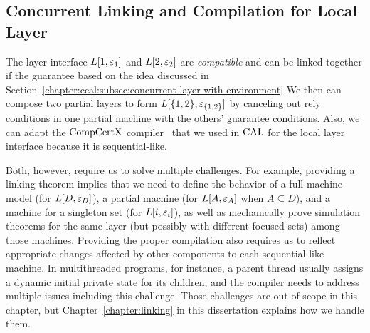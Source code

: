 \subsection{Concurrent Linking and Compilation for Local Layer}
\label{chapter:ccal:subsec:concurrent-linking-and compilation-for-local-layer}

The layer interface $L[1, {\varepsilon}_1]$ and $L[2, {\varepsilon}_2]$ are  {\em compatible} and can be linked together if the guarantee based on
the idea discussed in Section~\ref{chapter:ccal:subsec:concurrent-layer-with-environment}
We then can compose two partial layers to form 
$L[\{1, 2\}, {\varepsilon}_{\{1, 2\}}]$ by canceling out rely conditions in one partial machine with the others' guarantee conditions.
Also, we can adapt the $\mathrm{CompCertX}$ compiler~\cite{deepspec} that we used in $\mathrm{CAL}$
for the local layer interface because it is sequential-like.

Both, however, require us to solve multiple challenges. 
For example, providing a linking theorem  
implies that we need to define the behavior of a full machine model (for $L[D, {\varepsilon}_{D}]$), a partial machine (for $L[A, {\varepsilon}_{A}]$ when $A \subseteq D$), and 
a machine for a singleton set (for $L[i, {\varepsilon}_{i}]$), as well as mechanically prove simulation theorems for the same layer (but possibly with different focused sets) among those machines. 
Providing the proper compilation also requires 
us to reflect appropriate changes affected by other components to each sequential-like machine.
In multithreaded programs, for instance, a parent thread usually assigns a dynamic initial private state for its children,
and the compiler needs to address multiple issues including this challenge. 
Those challenges are out of scope in this chapter, but Chapter~\ref{chapter:linking} in this dissertation explains how we handle them.

